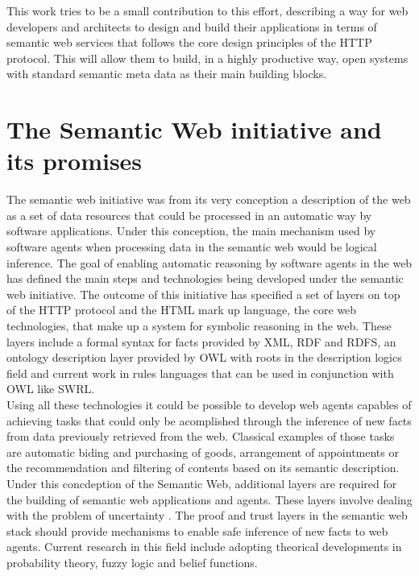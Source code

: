 This work tries to be a small contribution to this effort, describing a way for web developers and architects to design
and build their applications in terms of semantic web services that follows the core design principles of the HTTP
protocol. This will allow them to build, in a highly productive way, open systems with standard semantic meta data as
their main building blocks.

\section{The Semantic Web initiative and its promises}

The semantic web initiative was from its very conception a description of the web as a set of data resources that could be processed
in an automatic way by software applications. Under this conception, the main mechanism used by
software agents when processing data in the semantic web would be logical inference. The goal of enabling automatic
reasoning by software agents in the web has defined the main steps and technologies being developed under the semantic web
initiative. The outcome of this initiative has specified a set of layers on top of the HTTP protocol and the HTML mark up language, the core web
technologies, that make up a system for symbolic reasoning in the web. These layers include a formal syntax for facts provided
by XML, RDF and RDFS, an ontology description layer provided by OWL with roots in the description logics field and
current work in rules languages that can be used in conjunction with OWL like SWRL.\\

Using all these technologies it could be possible to develop web agents capables of achieving tasks that could only be
acomplished through the inference of new facts from data previously retrieved from the web. Classical examples of those tasks
are automatic biding and purchasing of goods, arrangement of appointments or the recommendation and filtering
of contents based on its semantic description.\\

Under this concdeption of the Semantic Web, additional layers are required for the building of semantic web applications and
agents. These layers involve dealing with the problem of uncertainty \cite{uncertaintyweb}. The proof and trust layers in the semantic web stack should provide mechanisms to enable
safe inference of new facts to web agents. Current research in this field include adopting theorical developments in
probability theory, fuzzy logic and belief functions.\\


